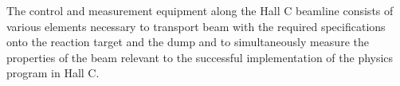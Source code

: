 
The control and measurement equipment along the Hall C beamline consists of 
various elements necessary to transport beam with the required specifications 
onto the reaction target and the dump and to simultaneously measure the 
properties of the beam relevant to the successful implementation of the 
physics program in Hall C.  


